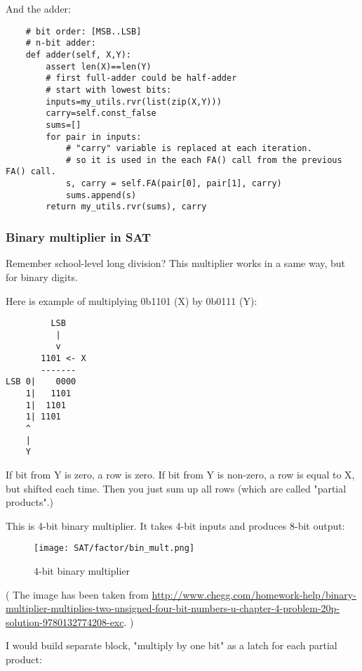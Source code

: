 And the adder:

\begin{lstlisting}
    # bit order: [MSB..LSB]
    # n-bit adder:
    def adder(self, X,Y):
        assert len(X)==len(Y)
        # first full-adder could be half-adder
        # start with lowest bits:
        inputs=my_utils.rvr(list(zip(X,Y)))
        carry=self.const_false
        sums=[]
        for pair in inputs:
            # "carry" variable is replaced at each iteration.
            # so it is used in the each FA() call from the previous FA() call.
            s, carry = self.FA(pair[0], pair[1], carry)
            sums.append(s)
        return my_utils.rvr(sums), carry
\end{lstlisting}

\subsubsection{Binary multiplier in SAT}

Remember school-level long division?
This multiplier works in a same way, but for binary digits.

Here is example of multiplying 0b1101 (X) by 0b0111 (Y):

\begin{lstlisting}
         LSB
          |
          v
       1101 <- X
       -------
LSB 0|    0000
    1|   1101
    1|  1101
    1| 1101
    ^
    |
    Y
\end{lstlisting}

If bit from Y is zero, a row is zero.
If bit from Y is non-zero, a row is equal to X, but shifted each time.
Then you just sum up all rows (which are called "partial products".)

This is 4-bit binary multiplier. It takes 4-bit inputs and produces 8-bit output:

\begin{figure}[H]
\centering
\texttt{[image: SAT/factor/bin\_mult.png]}
\caption{4-bit binary multiplier}
\end{figure}

( The image has been taken from \url{http://www.chegg.com/homework-help/binary-multiplier-multiplies-two-unsigned-four-bit-numbers-u-chapter-4-problem-20p-solution-9780132774208-exc}. )

I would build separate block, "multiply by one bit" as a latch for each partial product:

